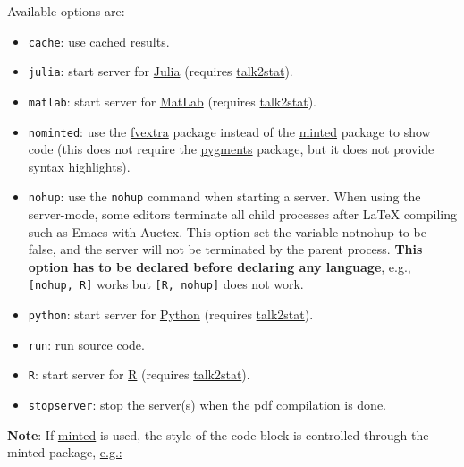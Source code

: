 \documentclass{ltxdoc}
\begin{document}
Available options are:

\begin{itemize}
\item \texttt{cache}: use cached results.

\item \texttt{julia}: start server for \href{https://julialang.org/}{Julia} (requires
\href{https://pypi.org/project/talk2stat/}{talk2stat}).

\item \texttt{matlab}: start server for
\href{https://www.mathworks.com/products/matlab.html}{MatLab} (requires
\href{https://pypi.org/project/talk2stat/}{talk2stat}).

\item \texttt{nominted}: use the \href{https://ctan.org/pkg/fvextra}{fvextra} package
instead of the \href{https://ctan.org/pkg/minted}{minted} package to show
code (this does not require the \href{https://pygments.org/}{pygments}
package, but it does not provide syntax highlights).

\item \texttt{nohup}: use the \texttt{nohup} command when starting a server. When using
the server-mode, some editors terminate all child processes after
\LaTeX{} compiling such as Emacs with Auctex. This option set the
variable notnohup to be false, and the server will not be terminated
by the parent process. \textbf{This option has to be declared before
declaring any language}, e.g., \texttt{[nohup, R]} works but \texttt{[R, nohup]}
does not work.

\item \texttt{python}: start server for \href{https://www.python.org/}{Python}
(requires \href{https://pypi.org/project/talk2stat/}{talk2stat}).

\item \texttt{run}: run source code.

\item \texttt{R}: start server for \href{https://www.r-project.org/}{R} (requires
\href{https://pypi.org/project/talk2stat/}{talk2stat}).

\item \texttt{stopserver}: stop the server(s) when the pdf compilation is done.
\end{itemize}

\textbf{Note}: If \href{https://ctan.org/pkg/minted}{minted} is used, the style of
the code block is controlled through the minted package,
\href{https://github.com/Ossifragus/runcode/blob/master/examples/MontyHall/MontyHall.tex\#L3-L4}{e.g.:}
\end{document}
